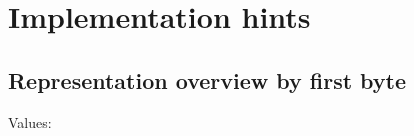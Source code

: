
\section{Implementation hints}
\label{sec:implementation}

\subsection{Representation overview by first byte}
\label{sec:implementation:representation_by_first_byte}

Values:\nolinebreak

